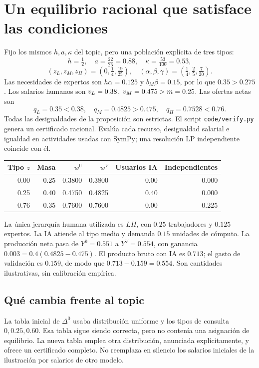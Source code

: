 \documentclass[11pt]{article}
\begin{document}
\newpage
\section{Un equilibrio racional que satisface las condiciones}
Fijo los mismos $h,a,\kappa$ del topic, pero una población explícita de tres tipos:
\[
h=\tfrac12,\quad a=\tfrac{22}{25}=0.88,\quad\kappa=\tfrac{53}{100}=0.53,
\]
\[
(z_L,z_M,z_H)=(0,\tfrac14,\tfrac{19}{25}),
\quad(\alpha,\beta,\gamma)=(\tfrac14,\tfrac25,\tfrac7{20}).
\]
Las necesidades de expertos son $h\alpha=0.125$ y $b_M\beta=0.15$, por lo que $0.35>0.275$. Los salarios humanos son $v_L=0.38$, $v_M=0.475>m=0.25$. Las ofertas netas son
\[
 q_L=0.35<0.38,\quad q_M=0.4825>0.475,\quad q_H=0.7528<0.76.
\]
Todas las desigualdades de la proposición son estrictas. El script \texttt{code/verify.py} genera un certificado racional. Evalúa cada recurso, desigualdad salarial e igualdad en actividades usadas con SymPy; una resolución LP independiente coincide con él.
\begin{center}
\begin{tabular}{rrrrrr}\toprule
Tipo $z$ & Masa & $w^0$ & $w^V$ & Usuarios IA & Independientes\\\midrule
0.00 &0.25 &0.3800 &0.3800 &0.00 &0.000\\
0.25 &0.40 &0.4750 &0.4825 &0.40 &0.000\\
0.76 &0.35 &0.7600 &0.7600 &0.00 &0.225\\\bottomrule
\end{tabular}
\end{center}
La única jerarquía humana utilizada es $LH$, con $0.25$ trabajadores y $0.125$ expertos. La IA atiende al tipo medio y demanda $0.15$ unidades de cómputo. La producción neta pasa de $Y^0=0.551$ a $Y^V=0.554$, con ganancia $0.003=0.4(0.4825-0.475)$. El producto bruto con IA es $0.713$; el gasto de validación es $0.159$, de modo que $0.713-0.159=0.554$. Son cantidades ilustrativas, sin calibración empírica.

\subsection{Qué cambia frente al topic}
La tabla inicial de $\Delta^0$ usaba distribución uniforme y los tipos de consulta $0,0.25,0.60$. Esa tabla sigue siendo correcta, pero no contenía una asignación de equilibrio. La nueva tabla emplea otra distribución, anunciada explícitamente, y ofrece un certificado completo. No reemplaza en silencio los salarios iniciales de la ilustración por salarios de otro modelo.
\end{document}
